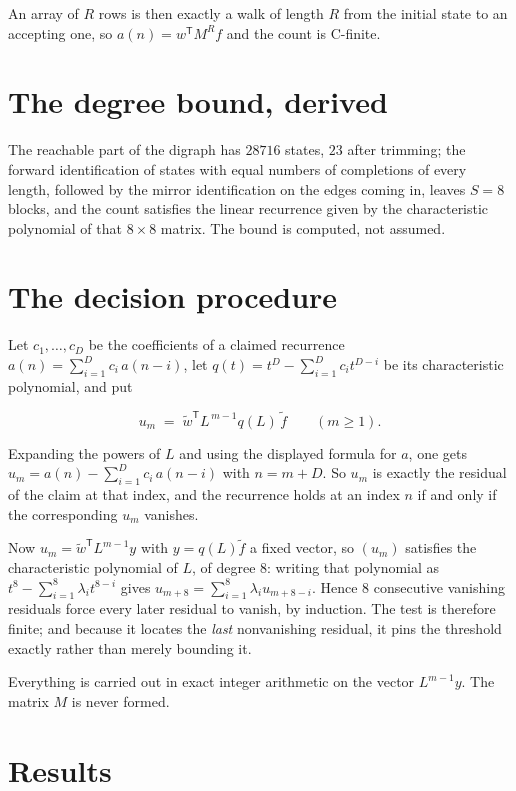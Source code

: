 \documentclass[11pt]{article}
\theoremstyle{definition}
\begin{document}
An array of $R$ rows is then exactly a walk of length $R$ from the initial state to an accepting one, so $a(n) = w^{\mathsf T}M^{R}f$ and the count is C-finite.

\section{The degree bound, derived}

The reachable part of the digraph has $28716$ states, $23$ after trimming; the forward identification of states with equal numbers of completions of every length, followed by the mirror identification on the edges coming in, leaves $S = 8$ blocks, and the count satisfies the linear recurrence given by the characteristic polynomial of that $8\times8$ matrix. The bound is computed, not assumed.

\section{The decision procedure}

Let $c_1,\dots,c_D$ be the coefficients of a claimed recurrence $a(n) = \sum_{i=1}^{D} c_i\,a(n-i)$, let $q(t) = t^{D} - \sum_{i=1}^{D} c_i t^{D-i}$ be its characteristic polynomial, and put

\[u_m \;=\; \tilde w^{\mathsf T} L^{\,m-1} q(L)\,\tilde f \qquad (m \ge 1).\]

Expanding the powers of $L$ and using the displayed formula for $a$, one gets $u_m = a(n) - \sum_{i=1}^{D} c_i\,a(n-i)$ with $n = m + D$. So $u_m$ is exactly the residual of the claim at that index, and the recurrence holds at an index $n$ if and only if the corresponding $u_m$ vanishes.

Now $u_m = \tilde w^{\mathsf T} L^{m-1} y$ with $y = q(L)\tilde f$ a fixed vector, so $(u_m)$ satisfies the characteristic polynomial of $L$, of degree $8$: writing that polynomial as $t^{8} - \sum_{i=1}^{8} \lambda_i t^{8-i}$ gives $u_{m+8} = \sum_{i=1}^{8} \lambda_i u_{m+8-i}$. Hence $8$ consecutive vanishing residuals force every later residual to vanish, by induction. The test is therefore finite; and because it locates the {\itshape last} nonvanishing residual, it pins the threshold exactly rather than merely bounding it.

Everything is carried out in exact integer arithmetic on the vector $L^{m-1}y$. The matrix $M$ is never formed.

\section{Results}
\end{document}
